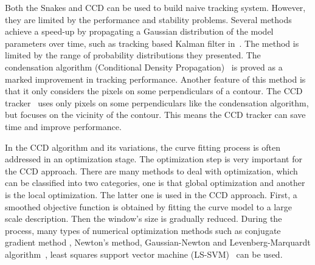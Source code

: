 Both the Snakes and CCD can be used to build naive tracking
system. However, they are limited by the performance and stability
problems. Several methods achieve a speed-up by propagating a Gaussian
distribution of the model parameters over time, such as tracking based
Kalman filter in~\cite{brookner1998tracking}. The method is limited by the range of probability
distributions they presented. The condensation algorithm (Conditional
Density Propagation)~\cite{isard1998icondensation} is proved as a marked improvement in tracking performance. Another feature of
this method is that it only considers the pixels on some
perpendiculars of a contour. The CCD tracker~\cite{hanek2004fitting} uses only
pixels on some perpendiculars like the condensation algorithm, but
focuses on the vicinity of the contour. This means the CCD tracker can
save time and improve performance.

In the CCD algorithm and its variations, the curve fitting process is
often addressed in an optimization stage. The optimization step is
very important for the CCD approach. There are many methods to
deal with optimization, which can be classified into two
categories, one is that global optimization and another is the local
optimization. The latter one is used in the CCD
approach. First, a smoothed objective function is obtained by fitting
the curve model to a large scale description. Then the window's size is
gradually reduced. During the process, many types of  numerical
optimization methods such as  conjugate gradient method , Newton's
method, Gaussian-Newton and Levenberg-Marquardt
algorithm~\cite{contourpanin2011}, least squares support vector
machine (LS-SVM)~\cite{vapnik2000nature} can be used.
